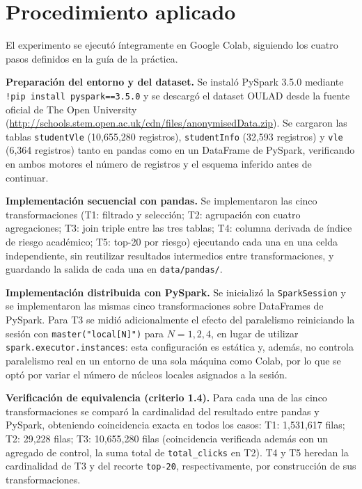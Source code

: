 \documentclass[11pt,a4paper]{article}
\begin{document}
\section{Procedimiento aplicado}
El experimento se ejecutó íntegramente en Google Colab, siguiendo los cuatro
pasos definidos en la guía de la práctica.

\textbf{Preparación del entorno y del dataset.} Se instaló PySpark 3.5.0
mediante \texttt{!pip install pyspark==3.5.0} y se descargó el dataset OULAD
desde la fuente oficial de The Open University
(\url{http://schools.stem.open.ac.uk/cdn/files/anonymisedData.zip}). Se
cargaron las tablas \texttt{studentVle} (10{,}655{,}280 registros),
\texttt{studentInfo} (32{,}593 registros) y \texttt{vle} (6{,}364 registros)
tanto en pandas como en un DataFrame de PySpark, verificando en ambos motores
el número de registros y el esquema inferido antes de continuar.

\textbf{Implementación secuencial con pandas.} Se implementaron las cinco
transformaciones (T1: filtrado y selección; T2: agrupación con cuatro
agregaciones; T3: join triple entre las tres tablas; T4: columna derivada de
índice de riesgo académico; T5: top-20 por riesgo) ejecutando cada una en una
celda independiente, sin reutilizar resultados intermedios entre
transformaciones, y guardando la salida de cada una en \texttt{data/pandas/}.

\textbf{Implementación distribuida con PySpark.} Se inicializó la
\texttt{SparkSession} y se implementaron las mismas cinco transformaciones
sobre DataFrames de PySpark. Para T3 se midió adicionalmente el efecto del
paralelismo reiniciando la sesión con \texttt{master("local[N]")} para
$N=1,2,4$, en lugar de utilizar \texttt{spark.executor.instances}: esta
configuración es estática y, además, no controla paralelismo real en un
entorno de una sola máquina como Colab, por lo que se optó por variar el
número de núcleos locales asignados a la sesión.

\textbf{Verificación de equivalencia (criterio 1.4).} Para cada una de las
cinco transformaciones se comparó la cardinalidad del resultado entre pandas
y PySpark, obteniendo coincidencia exacta en todos los casos:
T1: 1{,}531{,}617 filas; T2: 29{,}228 filas; T3: 10{,}655{,}280 filas
(coincidencia verificada además con un agregado de control, la suma total de
\texttt{total\_clicks} en T2). T4 y T5 heredan la cardinalidad de T3 y del
recorte \texttt{top-20}, respectivamente, por construcción de sus
transformaciones.
\end{document}
